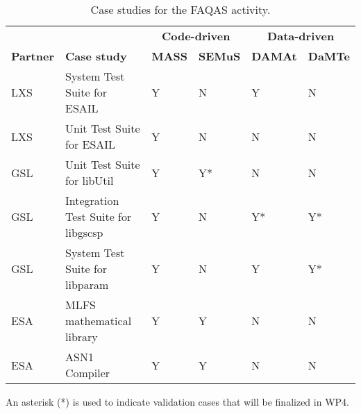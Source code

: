 \begin{table}[htp]
\caption{Case studies for the FAQAS activity.}
\label{tab:caseStudies}
\begin{center}
\begin{tabular}{|p{1.2cm}|p{6cm}|p{1.5cm}|p{1.5cm}|p{1.5cm}|p{1.5cm}|}
\hline
\textbf{}&\textbf{}&\multicolumn{2}{c}{\textbf{Code-driven}}&\multicolumn{2}{c|}{\textbf{Data-driven}}\\
\textbf{Partner}&\textbf{Case study}&\textbf{MASS}&\textbf{SEMuS}&\textbf{DAMAt}&\textbf{DaMTe}\\
\hline
LXS&System Test Suite for ESAIL&Y&N&Y&N\\
LXS&Unit Test Suite for ESAIL&Y&N&N&N\\
GSL&Unit Test Suite for libUtil&Y&Y*&N&N\\
GSL&Integration Test Suite for libgscsp&Y&N&Y*&Y*\\
GSL&System Test Suite for libparam&Y&N&Y&Y*\\
ESA&MLFS mathematical library&Y&Y&N&N\\
ESA&ASN1 Compiler&Y&Y&N&N\\
\hline
\end{tabular}
\end{center}
An asterisk (*) is used to indicate validation cases that will be finalized in WP4.
\end{table}

\ENDCHANGEDWPT

\clearpage










